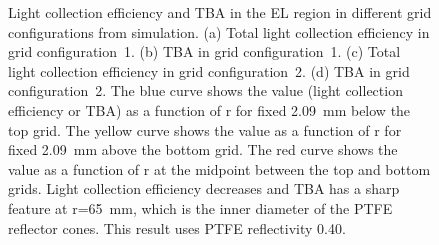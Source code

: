 \begin{figure}[!p]
	\caption[Light collection efficiency and TBA in the EL region in different grid configurations from simulation.]{Light collection efficiency and TBA in the EL region in different grid configurations from simulation. (a) Total light collection efficiency in grid configuration~1. (b) TBA in grid configuration~1. (c) Total light collection efficiency in grid configuration~2. (d) TBA in grid configuration~2. The blue curve shows the value (light collection efficiency or TBA) as a function of r for fixed \SI{2.09}{\mm} below the top grid. The yellow curve shows the value as a function of r for fixed \SI{2.09}{\mm} above the bottom grid. The red curve shows the value as a function of r at the midpoint between the top and bottom grids. Light collection efficiency decreases and TBA has a sharp feature at r=\SI{65}{\mm}, which is the inner diameter of the PTFE reflector cones. This result uses PTFE reflectivity \num{0.40}.}
	\label{fig: light collection r 040} 
\end{figure}




